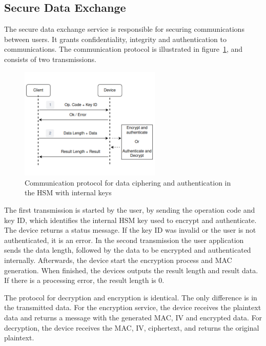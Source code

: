 \subsection{Secure Data Exchange}\label{chap:arch:services:data-exchange}

The secure data exchange service is responsible for securing communications between users. It grants confidentiality, integrity and authentication to communications.
The communication protocol is illustrated in figure~\ref{fig:protocol:data-exchange}, and consists of two transmissions.
\begin{figure}[h!]
	\centering
	\includegraphics[width=0.60\textwidth]{./Images/data-exchange.png}
	\caption{Communication protocol for data ciphering and authentication in the HSM with internal keys}
	\label{fig:protocol:data-exchange}
\end{figure}

The first transmission is started by the user, by sending the operation code and key ID, which identifies the internal \ac{HSM} key used to encrypt and authenticate.
The device returns a status message. If the key ID was invalid or the user is not authenticated, it is an error.
In the second transmission the user application sends the data length, followed by the data to be encrypted and authenticated internally.
Afterwards, the device start the encryption process and \ac{MAC} generation. When finished, the devices outputs the result length and result data. If there is a processing error, the result length is 0.

The protocol for decryption and encryption is identical. The only difference is in the transmitted data. For the encryption service, the device receives the plaintext data and returns a message with the generated \ac{MAC}, \ac{IV} and encrypted data. For decryption, the device receives the \ac{MAC}, \ac{IV}, ciphertext, and returns the original plaintext.

